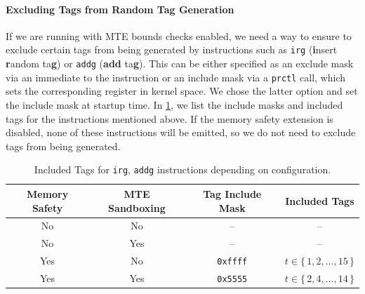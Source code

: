 \paragraph{Excluding Tags from Random Tag Generation}
If we are running with \ac{MTE} bounds checks enabled, we need a way to ensure to exclude certain tags from being generated by instructions such as \texttt{irg} (\textbf{i}nsert \textbf{r}andom ta\textbf{g}) or \texttt{addg} (\textbf{add} ta\textbf{g}).
This can be either specified as an exclude mask via an immediate to the instruction or an include mask via a \texttt{prctl} call, which sets the corresponding register in kernel space.
We chose the latter option and set the include mask at startup time.
In \cref{tab:tag-include-mask}, we list the include masks and included tags for the instructions mentioned above.
If the memory safety extension is disabled, none of these instructions will be emitted, so we do not need to exclude tags from being generated.

\begin{table}
  \centering
  \begin{tabular}{c | c || c | c}
    \textbf{Memory Safety} & \textbf{MTE Sandboxing} & \textbf{Tag Include Mask} & \textbf{Included Tags} \\
    \hline
    No  & No  & -- & -- \\
    No  & Yes & -- & -- \\
    Yes & No  & \texttt{0xffff} & $t \in \{\,1, 2, \dots, 15\,\}$ \\
    Yes & Yes & \texttt{0x5555} & $t \in \{\,2, 4, \dots, 14\,\}$
  \end{tabular}
  \caption{Included Tags for \texttt{irg}, \texttt{addg} instructions depending on configuration.}
  \label{tab:tag-include-mask}
\end{table}

